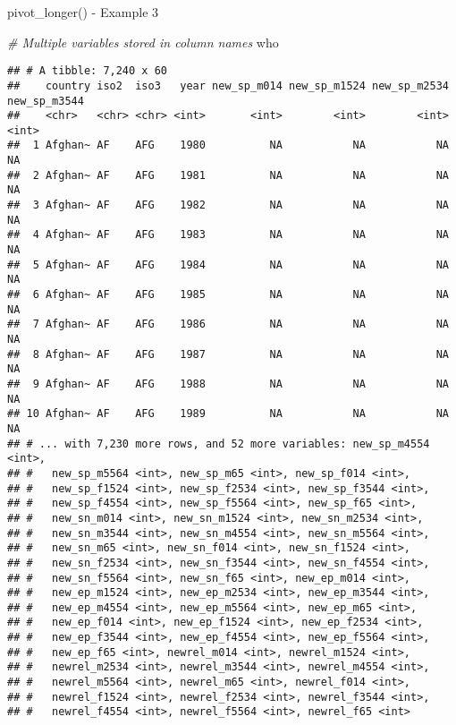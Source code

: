 \documentclass[
  ignorenonframetext,
]{beamer}
\newenvironment{Shaded}{\begin{snugshade}}{\end{snugshade}}
\newcommand{\CommentTok}[1]{\textcolor[rgb]{0.56,0.35,0.01}{\textit{#1}}}
\newcommand{\NormalTok}[1]{#1}
\begin{document}
\begin{frame}[fragile]{pivot\_longer() - Example 3}
\protect\hypertarget{pivot_longer---example-3}{}

\begin{Shaded}
\begin{Highlighting}[]
\CommentTok{# Multiple variables stored in column names}
\NormalTok{who}
\end{Highlighting}
\end{Shaded}

\begin{verbatim}
## # A tibble: 7,240 x 60
##    country iso2  iso3   year new_sp_m014 new_sp_m1524 new_sp_m2534 new_sp_m3544
##    <chr>   <chr> <chr> <int>       <int>        <int>        <int>        <int>
##  1 Afghan~ AF    AFG    1980          NA           NA           NA           NA
##  2 Afghan~ AF    AFG    1981          NA           NA           NA           NA
##  3 Afghan~ AF    AFG    1982          NA           NA           NA           NA
##  4 Afghan~ AF    AFG    1983          NA           NA           NA           NA
##  5 Afghan~ AF    AFG    1984          NA           NA           NA           NA
##  6 Afghan~ AF    AFG    1985          NA           NA           NA           NA
##  7 Afghan~ AF    AFG    1986          NA           NA           NA           NA
##  8 Afghan~ AF    AFG    1987          NA           NA           NA           NA
##  9 Afghan~ AF    AFG    1988          NA           NA           NA           NA
## 10 Afghan~ AF    AFG    1989          NA           NA           NA           NA
## # ... with 7,230 more rows, and 52 more variables: new_sp_m4554 <int>,
## #   new_sp_m5564 <int>, new_sp_m65 <int>, new_sp_f014 <int>,
## #   new_sp_f1524 <int>, new_sp_f2534 <int>, new_sp_f3544 <int>,
## #   new_sp_f4554 <int>, new_sp_f5564 <int>, new_sp_f65 <int>,
## #   new_sn_m014 <int>, new_sn_m1524 <int>, new_sn_m2534 <int>,
## #   new_sn_m3544 <int>, new_sn_m4554 <int>, new_sn_m5564 <int>,
## #   new_sn_m65 <int>, new_sn_f014 <int>, new_sn_f1524 <int>,
## #   new_sn_f2534 <int>, new_sn_f3544 <int>, new_sn_f4554 <int>,
## #   new_sn_f5564 <int>, new_sn_f65 <int>, new_ep_m014 <int>,
## #   new_ep_m1524 <int>, new_ep_m2534 <int>, new_ep_m3544 <int>,
## #   new_ep_m4554 <int>, new_ep_m5564 <int>, new_ep_m65 <int>,
## #   new_ep_f014 <int>, new_ep_f1524 <int>, new_ep_f2534 <int>,
## #   new_ep_f3544 <int>, new_ep_f4554 <int>, new_ep_f5564 <int>,
## #   new_ep_f65 <int>, newrel_m014 <int>, newrel_m1524 <int>,
## #   newrel_m2534 <int>, newrel_m3544 <int>, newrel_m4554 <int>,
## #   newrel_m5564 <int>, newrel_m65 <int>, newrel_f014 <int>,
## #   newrel_f1524 <int>, newrel_f2534 <int>, newrel_f3544 <int>,
## #   newrel_f4554 <int>, newrel_f5564 <int>, newrel_f65 <int>
\end{verbatim}

\end{frame}
\end{document}
